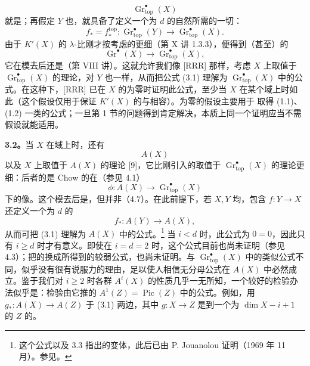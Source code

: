 \[\operatorname{Gr}_{\mathrm{top}}^\bullet(X)\]
就是；再假定 $Y$ 也，就具备了定义一个为 $d$ 的自然所需的一切：
\[f_*=f_*^{\mathrm{top}}:
\operatorname{Gr}_{\mathrm{top}}^\bullet(Y)\longrightarrow
\operatorname{Gr}_{\mathrm{top}}^\bullet(X).\]
由于 $K'(X)$ 的 $\lambda$-比刚才按考虑的更细（第 X 讲 1.3.3），便得到（甚至）的
\[\operatorname{Gr}^\bullet(X)\longrightarrow\operatorname{Gr}_{\mathrm{top}}^\bullet(X),\]
它在模去后还是（第 VIII 讲）。这就允许我们像 [RRR] 那样，考虑 $X$ 上取值于 $\operatorname{Gr}_{\mathrm{top}}^\bullet(X)$ 的理论，对 $Y$ 也一样，从而把公式 (3.1) 理解为 $\operatorname{Gr}_{\mathrm{top}}^\bullet(X)$ 中的公式。在这种下，[RRR] 已在 $X$ 的为零时证明此公式，至少当 $X$ 在某个域上时如此（这个假设仅用于保证 $K'(X)$ 的与相容）。为零的假设主要用于
取得 (1.1)、(1.2) 一类的公式；一旦第 1 节的问题得到肯定解决，本质上同一个证明应当不需假设就能适用。

\textbf{3.2。}当 $X$ 在域上时，还有 
\[A(X)\]
以及 $X$ 上取值于 $A(X)$ 的理论 [9]，它比刚引入的取值于 $\operatorname{Gr}_{\mathrm{top}}^\bullet(X)$ 的理论更细：后者的是 Chow 的在（参见 4.1）
\[\phi:A(X)\longrightarrow\operatorname{Gr}_{\mathrm{top}}^\bullet(X)\]
下的像。这个模去后是，但并非（4.7）。在此前提下，若 $X,Y$ 均，包含 $f:Y\to X$ 还定义一个为 $d$ 的
\[f_*:A(Y)\longrightarrow A(X),\]
从而可把 (3.1) 理解为 $A(X)$ 中的公式。\footnote{这个公式以及 3.3 指出的变体，此后已由 P. Jouanolou 证明（1969 年 11 月）。参见。}
当 $i<d$ 时，此公式为 $0=0$，因此只有 $i\geq d$ 时才有意义。即使在 $i=d=2$ 时，这个公式目前也尚未证明（参见 4.3）；把的换成所得到的较弱公式，也尚未证明。与 $\operatorname{Gr}_{\mathrm{top}}^\bullet(X)$ 中的类似公式不同，似乎没有很有说服力的理由，足以使人相信无分母公式在 $A(X)$ 中必然成立。鉴于我们对 $i\geq2$ 时各群 $A^i(X)$ 的性质几乎一无所知，一个较好的检验办法似乎是：检验由它推的 $A^1(Z)=\operatorname{Pic}(Z)$ 中的公式。例如，用 $g_*:A(X)\to A(Z)$ 于 (3.1) 两边，其中 $g:X\to Z$ 是到一个为 $\dim X-i+1$ 的 $Z$ 的。

